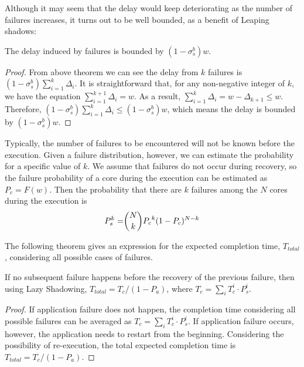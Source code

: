 Although it may seem that the delay would keep deteriorating as the number of failures increases, 
it turns out to be well bounded, as a benefit of Leaping shadows:

\begin{corollary}
The delay induced by failures is bounded by $(1-\sigma_s^b)w$.
\end{corollary}
\begin{proof}
From above theorem we can see the delay from $k$ failures is $(1-\sigma_s^b)\sum_{i=1}^k\Delta_i$. It is straightforward that, for any non-negative integer of $k$, we have the equation $\sum_{i=1}^{k+1}\Delta_i= w$. As a result, 
$\sum_{i=1}^{k}\Delta_i = w - \Delta_{k+1} \le w$. Therefore, $(1-\sigma_s^b)\sum_{i=1}^k\Delta_i \le (1-\sigma_s^b)w$, which means the delay is bounded by $(1-\sigma_s^b)w$.
\end{proof}

Typically, the number of failures to be encountered will not be known before the execution. Given a failure distribution, however, we can estimate the probability for a specific value of $k$. We assume that failures do not occur during recovery, so the failure probability of a core during the execution can be estimated as $P_c = F(w)$. Then the probability that there are $k$ failures among the $N$ cores during the execution is 
\begin{equation}
\begin{split}
P_s^{k}= & \dbinom{N}{k}{P_c}^k(1-P_c)^{N-k} \\
\end{split}
\end{equation}

The following theorem gives an expression for the expected completion time, $T_{total}$, considering all possible cases of failures. 

\begin{theorem}
If no subsequent failure happens before the recovery of the previous failure, then using Lazy Shadowing,
$T_{total} = T_{c} / (1 - P_a)$, where $T_{c} = \sum_{i} T_{c}^{i} \cdot P_s^{i}$.
\end{theorem}
\begin{proof}
If application failure does not happen, the completion time considering all possible failures can be averaged as $T_{c} = \sum_{i} T_{c}^{i} \cdot P_s^{i}$. If application failure occurs, however, the application needs to restart from the beginning. Considering the possibility of re-execution, the total expected completion time is $T_{total} = T_{c} / (1 - P_a)$.
\end{proof}

